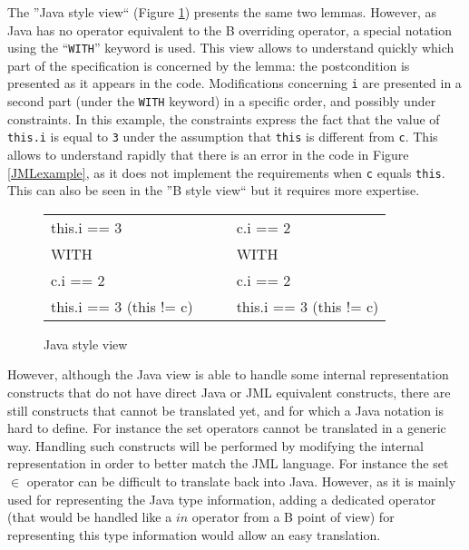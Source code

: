  The ''Java style view`` (Figure \ref{Java style view}) presents the
 same two lemmas. However, as Java has no operator equivalent to the
 B overriding operator, a special notation using the
 ``\texttt{WITH}'' keyword is used. This view allows to understand
 quickly which part of the specification is concerned by the lemma:
 the postcondition is presented as it appears in the
 code. Modifications concerning \texttt{i} are presented in a second
 part (under the \texttt{WITH} keyword) in a specific order, and
 possibly under constraints. In this example, the constraints express
 the fact that the value of \texttt{this.i} is equal to \texttt{3}
 under the assumption that \texttt{this} is different from \texttt{c}.
 This allows to understand rapidly that there is an error in the code
 in Figure \ref{JMLexample}, as it does not implement the
 requirements when \texttt{c} equals \texttt{this}. This can also be
 seen in the ''B style view`` but it requires more expertise.
\begin{figure}[htp]
\begin{center}
 \begin{tabular}{ll|ll}
 this.i == 3 & \hspace{2mm} & \hspace{3mm} & c.i == 2 \\
 WITH & &       &  WITH       \\
 c.i == 2 & &   &  c.i == 2     \\
 this.i == 3 (this != c) & & & this.i == 3 (this != c)
 \end{tabular}
 \caption{Java style view}
 \label{Java style view}
\end{center}
\end{figure}

 However, although the Java view is able to handle some internal
 representation constructs that do not have direct Java or JML
 equivalent constructs, there are still constructs that cannot be
 translated yet, and for which a Java notation is hard to define. For
 instance the set operators cannot be translated in a generic way.
 Handling such constructs will be performed by modifying the internal
 representation in order to better match the JML language. For
 instance the set $\in$ operator can be difficult to translate back
 into Java. However, as it is mainly used for representing the Java
 type information, adding a dedicated operator (that would be handled
 like a $in$ operator from a B point of view) for
 representing this type information would allow an easy translation.

